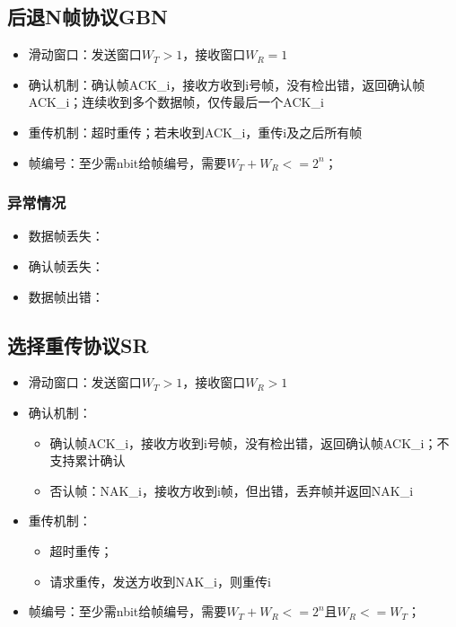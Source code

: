 \subsection{后退N帧协议GBN}
\begin{itemize}
    \item 滑动窗口：发送窗口\(W_T > 1\)，接收窗口\(W_R = 1\)
    \item 确认机制：确认帧ACK\_i，接收方收到i号帧，没有检出错，返回确认帧ACK\_i；连续收到多个数据帧，仅传最后一个ACK\_i
    \item 重传机制：超时重传；若未收到ACK\_i，重传i及之后所有帧
    \item 帧编号：至少需nbit给帧编号，需要\(W_T + W_R <= 2^n\)；
\end{itemize}

\subsubsection{异常情况}
\begin{itemize}
    \item 数据帧丢失：
    \item 确认帧丢失：
    \item 数据帧出错：
\end{itemize}


\subsection{选择重传协议SR}
\begin{itemize}
    \item 滑动窗口：发送窗口\(W_T > 1\)，接收窗口\(W_R > 1\)
    \item 确认机制：\begin{itemize}
        \item 确认帧ACK\_i，接收方收到i号帧，没有检出错，返回确认帧ACK\_i；不支持累计确认
        \item 否认帧：NAK\_i，接收方收到i帧，但出错，丢弃帧并返回NAK\_i
    \end{itemize}
    \item 重传机制：\begin{itemize}
        \item 超时重传；
        \item 请求重传，发送方收到NAK\_i，则重传i
    \end{itemize}
    \item 帧编号：至少需nbit给帧编号，需要\(W_T + W_R <= 2^n\)且\(W_R <= W_T\)；
\end{itemize}


